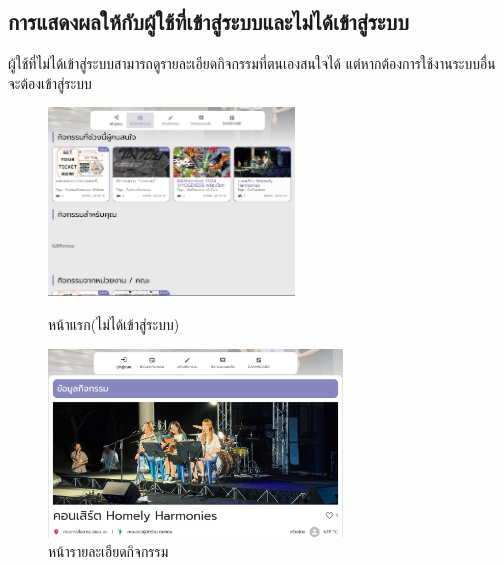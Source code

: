 \subsection{การแสดงผลให้กับผู้ใช้ที่เข้าสู่ระบบและไม่ได้เข้าสู่ระบบ}
ผู้ใช้ที่ไม่ได้เข้าสู่ระบบสามารถดูรายละเอียดกิจกรรมที่ตนเองสนใจได้ แต่หากต้องการใช้งานระบบอื่น จะต้องเข้าสู่ระบบ
\begin{figure}[H]
    \begin{minipage}[b]{0.48\textwidth}
        \includegraphics[width=\textwidth, height=5cm]{public/landing-nologin.jpg}
        \caption[ผลทดลองหน้าแรก(ไม่ได้เข้าสู่ระบบ)]{หน้าแรก(ไม่ได้เข้าสู่ระบบ)}
    \end{minipage}
    \hfill
    \begin{minipage}[b]{0.48\textwidth}
        \includegraphics[width=\textwidth, height=5cm]{public/act-nologin.jpg}
        \caption[ผลทดลองหน้ารายละเอียดกิจกรรม]{หน้ารายละเอียดกิจกรรม}
    \end{minipage}
\end{figure}
